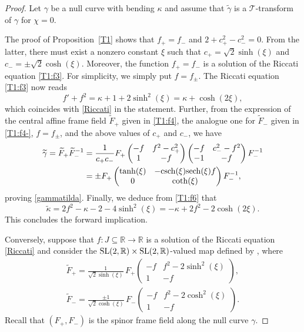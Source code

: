 \documentclass[pdftex]{sigma}
\numberwithin{equation}{section}
\def\bending{\kappa}
\def\R{\mathbb{R}}
\def\SL{{\rm SL}(2,\R)}
\def\sech{{\rm sech}}
\def\csch{{\rm csch}}
\begin{document}
\begin{proof} Let $\gamma$ be a null curve with bending $\bending$ and assume that $\widetilde{\gamma}$ is a $\mathcal{T}$-transform of $\gamma$ for $\chi=0$.
	
	The proof of Proposition~\ref{T1} shows that $f_+=f_-$ and $2+c_+^2-c_-^2=0$. From the latter, there must exist a nonzero constant $\xi$ such that $c_+=\sqrt{2}\sinh(\xi)$ and $c_-=\pm\sqrt{2}\cosh(\xi)$. Moreover, the function $f_+=f_-$ is a solution of the Riccati equation \eqref{T1:f3}. For simplicity, we simply put $f=f_\pm$. The Riccati equation \eqref{T1:f3} now reads
	\begin{equation*}f'+f^2=\bending+1+2\sinh^2(\xi)=\bending+\cosh(2\xi),\end{equation*}
	which coincides with \eqref{Riccati} in the statement. Further, from the expression of the central affine frame field $\widetilde{F}_+$ given in \eqref{T1:f4}, the analogue one for $\widetilde{F}_-$ given in \eqref{T1:f4-}, $f=f_\pm$, and the above values of $c_+$ and $c_-$, we have
	\begin{align*}
		\widetilde{\gamma}=\widetilde{F}_+\widetilde{F}_-^{-1}&{}=\frac{1}{c_+c_-}F_+\begin{pmatrix} -f & f^2-c_+^2 \\ 1 & -f \end{pmatrix}\begin{pmatrix} -f & c_-^2-f^2 \\ -1 & -f\end{pmatrix}F_-^{-1}\\
		&{}=\pm F_+\begin{pmatrix} \tanh(\xi) & -\csch(\xi)\sech(\xi)f \\ 0 & \coth(\xi)\end{pmatrix}F_-^{-1},
	\end{align*}
	proving \eqref{gammatilda}. Finally, we deduce from \eqref{T1:f6} that
	\begin{equation*}\widetilde{\bending}=2f^2-\bending-2-4\sinh^2(\xi)=-\bending+2f^2-2\cosh(2\xi).\end{equation*}
	This concludes the forward implication.
	
	Conversely, suppose that $f\colon J\subseteq\R\longrightarrow\R$ is a solution of the Riccati equation \eqref{Riccati} and consider the $\SL\times\SL$-valued map defined by , where
	\begin{gather}
		\widetilde{F}_+=\frac{1}{\sqrt{2} \sinh(\xi)}\,F_+\begin{pmatrix} -f & f^2-2\sinh^2(\xi) \\ 1 & -f\end{pmatrix},\label{tildeF+}\\
		\widetilde{F}_-=\frac{\pm 1}{\sqrt{2} \cosh(\xi)}\,F_-\begin{pmatrix} -f & f^2-2\cosh^2(\xi) \\ 1 & -f \end{pmatrix}.\label{tildeF-}
	\end{gather}
	Recall that $(F_+,F_-)$ is the spinor frame field along the null curve $\gamma$.
	

\end{proof}
\end{document}
